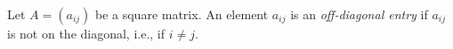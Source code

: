 \documentclass[12pt]{article}
\begin{document}
Let $A=(a_{ij})$ be a square matrix. An element $a_{ij}$ is an 
\emph{off-diagonal entry} if $a_{ij}$ is not on the diagonal, i.e., if $i\neq j$.
\end{document}
